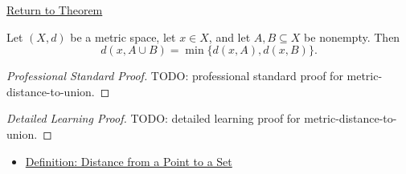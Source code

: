 \newpage
{}
\label{prf:metric-distance-to-union}

\begin{remark*}[Return]
\hyperref[thm:metric-distance-to-union]{Return to Theorem}
\end{remark*}

\begin{theorem*}
Let \((X,d)\) be a metric space, let \(x\in X\), and let \(A,B\subseteq X\)
be nonempty.  Then
\[
  d(x,A\cup B)=\min\{d(x,A),d(x,B)\}.
\]
\end{theorem*}

\begin{proof}[Professional Standard Proof]
\LRAProofBodyStart
TODO: professional standard proof for metric-distance-to-union.
\end{proof}

\begin{proof}[Detailed Learning Proof]
\LRAProofBodyStart
TODO: detailed learning proof for metric-distance-to-union.
\end{proof}

\begin{remark*}
\end{remark*}

\begin{dependencies}
\begin{itemize}
  \item \hyperref[def:metric-point-set-distance]{Definition: Distance from a Point to a Set}
\end{itemize}
\end{dependencies}

\clearpage
